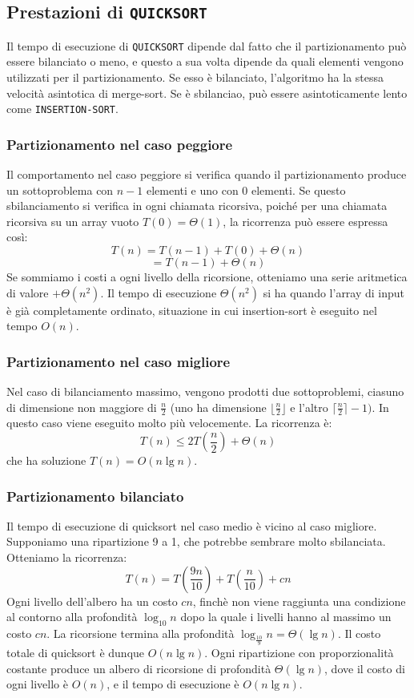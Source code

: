 \documentclass[11pt,a4paper]{article}
\begin{document}
\subsection{Prestazioni di \texttt{QUICKSORT}}
Il tempo di esecuzione di \texttt{QUICKSORT} dipende dal fatto che il partizionamento può essere bilanciato o meno, e
questo a sua volta dipende da quali elementi vengono utilizzati per il partizionamento. Se esso è bilanciato,
l’algoritmo ha la stessa velocità asintotica di merge-sort. Se è sbilanciao, può essere asintoticamente lento
come \texttt{INSERTION-SORT}.

\subsubsection{Partizionamento nel caso peggiore}
Il comportamento nel caso peggiore si verifica quando il partizionamento produce un sottoproblema con $n-1$
elementi e uno con 0 elementi. Se questo sbilanciamento si verifica in ogni chiamata ricorsiva, poiché per una
chiamata ricorsiva su un array vuoto $T(0) = \Theta(1)$, la ricorrenza può essere espressa così:
\[T(n) = T(n-1) + T(0) + \Theta(n)\]
\[= T(n-1) + \Theta(n)\]
Se sommiamo i costi a ogni livello della ricorsione, otteniamo una serie aritmetica di valore $+ \Theta(n^2)$.
Il tempo di esecuzione $\Theta(n^2)$ si ha quando l’array di input è già completamente ordinato, situazione in cui
insertion-sort è eseguito nel tempo $O(n)$.

\subsubsection{Partizionamento nel caso migliore}
Nel caso di bilanciamento massimo, vengono prodotti due sottoproblemi, ciasuno di dimensione non maggiore
di $\frac{n}{2}$ (uno ha dimensione $\lfloor \frac{n}{2} \rfloor$ e l’altro $\lceil \frac{n}{2} \rceil -1)$. In questo caso viene eseguito molto più velocemente. La
ricorrenza è:
\[T(n) \leq 2T(\frac{n}{2}) + \Theta(n)\]
che ha soluzione $T(n) = O(n \lg n)$.

\subsubsection{Partizionamento bilanciato}
Il tempo di esecuzione di quicksort nel caso medio è vicino al caso migliore.
Supponiamo una ripartizione 9 a 1, che potrebbe sembrare molto sbilanciata. Otteniamo la ricorrenza:
\[T(n) = T(\frac{9n}{10}) + T(\frac{n}{10}) + cn\]
Ogni livello dell’albero ha un costo $cn$, finchè non viene raggiunta una condizione al contorno alla profondità
$\log_10 n$ dopo la quale i livelli hanno al massimo un costo $cn$.
La ricorsione termina alla profondità $\log_{\frac{10}{9}} n = \Theta(\lg n)$. Il costo totale di quicksort è dunque $O(n \lg n)$.
Ogni ripartizione con proporzionalità costante produce un albero di ricorsione di profondità $\Theta(\lg n)$, dove il
costo di ogni livello è $O(n)$, e il tempo di esecuzione è $O(n \lg n)$.
\end{document}
